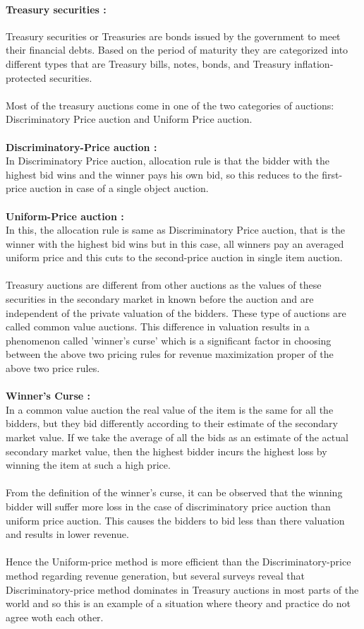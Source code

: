 \documentclass[a4paper]{article}
\begin{document}
\paragraph{Treasury securities :} Treasury securities or Treasuries are bonds issued by the government to meet their financial debts. Based on the period of maturity they are categorized into different types that are Treasury bills, notes, bonds, and Treasury inflation-protected securities.
\\\\
Most of the treasury auctions come in one of the two categories of auctions: Discriminatory Price auction and Uniform Price auction.
\\\\
\textbf{Discriminatory-Price auction :} \\In Discriminatory Price auction, allocation rule is that the bidder with the highest bid wins and the winner pays his own bid, so this reduces to the first-price auction in case of a single object auction.
\\\\
\textbf{Uniform-Price auction :} \\In this, the allocation rule is same as Discriminatory Price auction, that is the winner with the highest bid wins but in this case, all winners pay an averaged uniform price and this cuts to the second-price auction in single item auction.
\\\\
Treasury auctions are different from other auctions as the values of these securities in the secondary market in known before the auction and are independent of the private valuation of the bidders. These type of auctions are called common value auctions. This difference in valuation results in a phenomenon called 'winner's curse' which is a significant factor in choosing between the above two pricing rules for revenue maximization proper of the above two price rules.
\\\\
\textbf{Winner's Curse :}\\ In a common value auction the real value of the item is the same for all the bidders, but they bid differently according to their estimate of the secondary market value. If we take the average of all the bids as an estimate of the actual secondary market value, then the highest bidder incurs the highest loss by winning the item at such a high price.
\\\\
From the definition of the winner's curse, it can be observed that the winning bidder will suffer more loss in the case of discriminatory price auction than uniform price auction. This causes the bidders to bid less than there valuation and results in lower revenue.
\\\\
Hence the Uniform-price method is more efficient than the Discriminatory-price method regarding revenue generation, but several surveys reveal that Discriminatory-price method dominates in Treasury auctions in most parts of the world and so this is an example of a situation where theory and practice do not agree woth each other.
\end{document}
